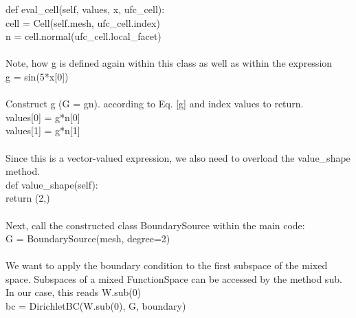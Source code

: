 \documentclass[12pt,3p]{article}
\begin{document}
{\selectfont
\indent def eval\_cell(self, values, x, ufc\_cell): \\
\indent \indent  cell = Cell(self.mesh, ufc\_cell.index) \\
\indent \indent  n = cell.normal(ufc\_cell.local\_facet) \\ \\
}
Note, how g is defined again within this class as well as within the expression \\
{\selectfont
\indent \indent   g = sin(5*x[0]) \\ \\
}
Construct g (G = gn). according to Eq. \ref{g} and index values to return. \\
{\selectfont
\indent \indent  values[0] = g*n[0] \\
\indent \indent  values[1] = g*n[1] \\ \\
}
Since this is a vector-valued expression, we also need to overload the {\selectfont value\_shape} method. \\
{\selectfont
\indent def value\_shape(self): \\
\indent \indent  return (2,) \\ \\
}
Next, call the constructed class {\selectfont BoundarySource } within the main code: \\ 
{\selectfont
G = BoundarySource(mesh, degree=2) \\ \\
}
We want to apply the boundary condition to the first subspace of the mixed space. Subspaces of a mixed FunctionSpace can be accessed by the method sub. In our case, this reads {\selectfont W.sub(0)} \\
{\selectfont
bc = DirichletBC(W.sub(0), G, boundary)
}
\end{document}
